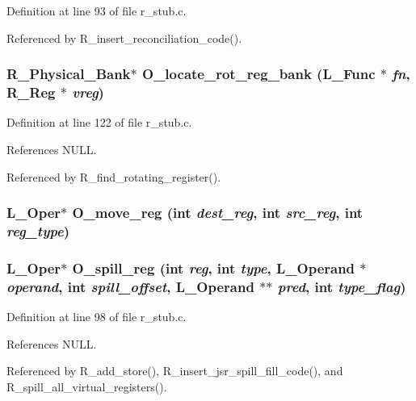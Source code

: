 Definition at line 93 of file r\_\-stub.c.

Referenced by R\_\-insert\_\-reconciliation\_\-code().
\subsubsection{\setlength{\rightskip}{0pt plus 5cm}\bf{R\_\-Physical\_\-Bank}$\ast$ O\_\-locate\_\-rot\_\-reg\_\-bank (L\_\-Func $\ast$ {\em fn}, \bf{R\_\-Reg} $\ast$ {\em vreg})}\label{r__regalloc_8h_50a0a78097d883cc35ed5656fd2b2182}




Definition at line 122 of file r\_\-stub.c.

References NULL.

Referenced by R\_\-find\_\-rotating\_\-register().
\subsubsection{\setlength{\rightskip}{0pt plus 5cm}L\_\-Oper$\ast$ O\_\-move\_\-reg (int {\em dest\_\-reg}, int {\em src\_\-reg}, int {\em reg\_\-type})}\label{r__regalloc_8h_7a0c9cc9975e308ac3e6fb0105e092ac}


\subsubsection{\setlength{\rightskip}{0pt plus 5cm}L\_\-Oper$\ast$ O\_\-spill\_\-reg (int {\em reg}, int {\em type}, L\_\-Operand $\ast$ {\em operand}, int {\em spill\_\-offset}, L\_\-Operand $\ast$$\ast$ {\em pred}, int {\em type\_\-flag})}\label{r__regalloc_8h_5249a2aa8d7d7d5dd3017f2381970f4e}




Definition at line 98 of file r\_\-stub.c.

References NULL.

Referenced by R\_\-add\_\-store(), R\_\-insert\_\-jsr\_\-spill\_\-fill\_\-code(), and R\_\-spill\_\-all\_\-virtual\_\-registers().
